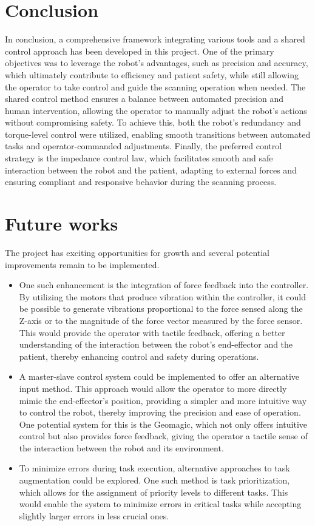 \documentclass{article}
\begin{document}
\section{Conclusion}
In conclusion, a comprehensive framework integrating various tools and a shared control approach has been developed in this project. One of the primary objectives was to leverage the robot’s advantages, such as precision and accuracy, which ultimately contribute to efficiency and patient safety, while still allowing the operator to take control and guide the scanning operation when needed. The shared control method ensures a balance between automated precision and human intervention, allowing the operator to manually adjust the robot’s actions without compromising safety. To achieve this, both the robot’s redundancy and torque-level control were utilized, enabling smooth transitions between automated tasks and operator-commanded adjustments. Finally, the preferred control strategy is the impedance control law, which facilitates smooth and safe interaction between the robot and the patient, adapting to external forces and ensuring compliant and responsive behavior during the scanning process.



\section{Future works}
The project has exciting opportunities for growth and several potential improvements remain to be implemented.
\begin{itemize}
\item One such enhancement is the integration of force feedback into the controller. By utilizing the motors that produce vibration within the controller, it could be possible to generate vibrations proportional to the force sensed along the Z-axis or to the magnitude of the force vector measured by the force sensor. This would provide the operator with tactile feedback, offering a better understanding of the interaction between the robot’s end-effector and the patient, thereby enhancing control and safety during operations.
\item A master-slave control system could be implemented to offer an alternative input method. This approach would allow the operator to more directly mimic the end-effector’s position, providing a simpler and more intuitive way to control the robot, thereby improving the precision and ease of operation. One potential system for this is the Geomagic, which not only offers intuitive control but also provides force feedback, giving the operator a tactile sense of the interaction between the robot and its environment.
\item To minimize errors during task execution, alternative approaches to task augmentation could be explored. One such method is task prioritization, which allows for the assignment of priority levels to different tasks. This would enable the system to minimize errors in critical tasks while accepting slightly larger errors in less crucial ones.
\end{itemize}
\end{document}
